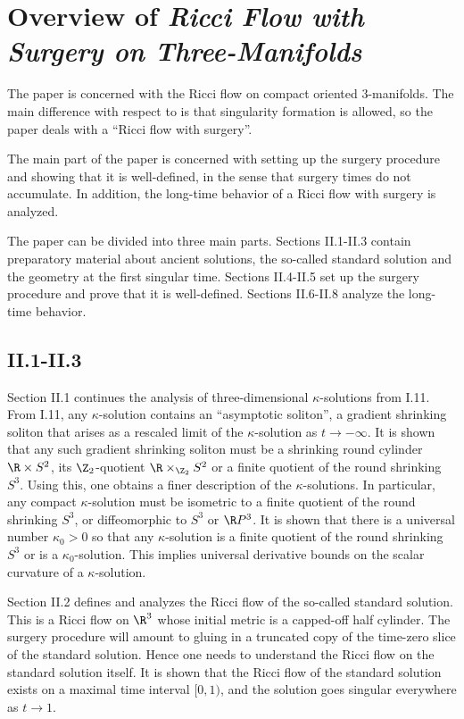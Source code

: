 \section{Overview of
{\em Ricci Flow with Surgery on
Three-Manifolds}  \cite{Perelman2}} \label{overview2}

The paper \cite{Perelman2} is concerned with the Ricci flow on compact oriented
$3$-manifolds.  The main difference with respect to \cite{Perelman}
is that singularity formation is allowed, so the paper deals with
a ``Ricci flow with surgery''.

The main part of the paper is concerned with
setting up the surgery procedure and showing that it is
well-defined, in the sense that surgery times do not
accumulate.  In addition, the long-time behavior of a
Ricci flow with surgery is analyzed.

The paper can be divided into three main parts.
Sections II.1-II.3 contain preparatory material about ancient
solutions, the so-called standard solution and the geometry
at the first singular time.  Sections II.4-II.5 set up the
surgery procedure and prove that it is well-defined.
Sections II.6-II.8 analyze the long-time behavior.

\subsection{II.1-II.3}

Section II.1 continues the analysis of three-dimensional
$\kappa$-solutions from I.11.  From I.11, any $\kappa$-solution
contains an ``asymptotic soliton'', a gradient shrinking
soliton that arises as a rescaled limit of the $\kappa$-solution
as $t \rightarrow - \infty$. It is shown that any such
gradient shrinking soliton must be a shrinking round cylinder $\R \times S^2$,
its $\Z_2$-quotient $\R \times_{\Z_2} S^2$
or a finite quotient of the
round shrinking $S^3$. Using this, one
obtains a finer description of the $\kappa$-solutions. In
particular, any compact $\kappa$-solution must be isometric
to a finite quotient of the round shrinking $S^3$, or
diffeomorphic to $S^3$ or $\R P^3$. It is shown that there is
a universal number $\kappa_0 > 0$ so that any $\kappa$-solution
is a finite quotient of the round shrinking $S^3$ or is a
$\kappa_0$-solution. This implies universal
derivative bounds on the scalar curvature of a $\kappa$-solution.

Section II.2 defines and analyzes the Ricci flow of the
so-called standard solution.  This is a Ricci flow on $\R^3$ whose
initial metric is a capped-off half cylinder.  The surgery
procedure will amount to gluing in a truncated copy of the
time-zero slice of the standard solution. Hence one
needs to understand the Ricci flow on the standard solution
itself.  It is shown that the Ricci flow of the standard
solution exists on a maximal time interval $[0,1)$, and the
solution goes singular everywhere as $t \rightarrow 1$.

